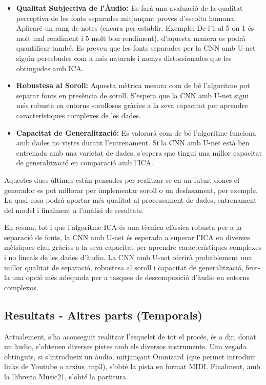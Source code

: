 \documentclass[10pt,a4paper,twocolumn,twoside]{article}
\begin{document}
\begin{itemize}
    \item \textbf{Qualitat Subjectiva de l'Àudio:} Es farà una avaluació de la qualitat perceptiva de les fonts separades mitjançant proves d'escolta humana. Aplicaré un rang de notes (encara per establir. Exemple: De l'1 al 5 on 1 és molt mal rendiment i 5 molt bon rendiment), d'aquesta manera es podrà quantificar també. Es preveu que les fonts separades per la CNN amb U-net siguin percebudes com a més naturals i menys distorsionades que les obtingudes amb ICA.
    
    \item \textbf{Robustesa al Soroll:} Aquesta mètrica mesura com de bé l'algoritme pot separar fonts en presència de soroll. S'espera que la CNN amb U-net sigui més robusta en entorns sorollosos gràcies a la seva capacitat per aprendre característiques complexes de les dades.
    
    \item \textbf{Capacitat de Generalització:} Es valorarà com de bé l'algoritme funciona amb dades no vistes durant l'entrenament. Si la CNN amb U-net està ben entrenada amb una varietat de dades, s'espera que tingui una millor capacitat de generalització en comparació amb l'ICA.
\end{itemize}

Aquestes dues últimes estàn pensades per realitzar-se en un futur, doncs el generador es pot millorar per implementar soroll o un desfasament, per exemple. La qual cosa podrà aportar més qualitat al processament de dades, entrenament del model i finalment a l'anàlisi de resultats.

En resum, tot i que l'algoritme ICA és una tècnica clàssica robusta per a la separació de fonts, la CNN amb U-net és esperada a superar l'ICA en diverses mètriques clau gràcies a la seva capacitat per aprendre característiques complexes i no lineals de les dades d'àudio. La CNN amb U-net oferirà probablement una millor qualitat de separació, robustesa al soroll i capacitat de generalització, fent-la una opció més adequada per a tasques de descomposició d'àudio en entorns complexos.


\subsection{Resultats - Altres parts (Temporals)}

Actualement, s'ha aconseguit realitzar l'esquelet de tot el procés, és a dir, donat un àudio, s'obtenen diverses pistes amb els diversos instruments. Una vegada obtinguts, si s'introdueix un àudio, mitjançant Omnizard (que permet introduir links de Youtube o arxius .mp3), s'obté la pista en format MIDI. Finalment, amb la llibreria Music21, s'obté la partitura.
\end{document}
